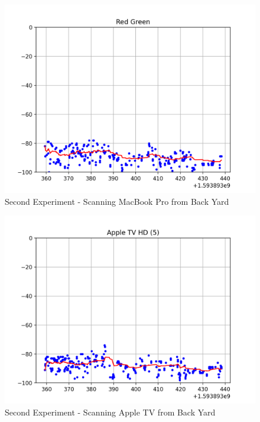 \documentclass[12pt]{article}
\begin{document}
\begin{figure}[ht]
    \centering
    \includegraphics[width=1.0\textwidth]{Experiment-2-MBP.png}
    \caption{Second Experiment - Scanning MacBook Pro from Back Yard}
    \label{fig:experiment-2-mbp}
\end{figure}


\begin{figure}[ht]
    \centering
    \includegraphics[width=1.0\textwidth]{Experiment-2-ATV.png}
    \caption{Second Experiment - Scanning Apple TV from Back Yard}
    \label{fig:experiment-2-atv}
\end{figure}

\clearpage
\end{document}
